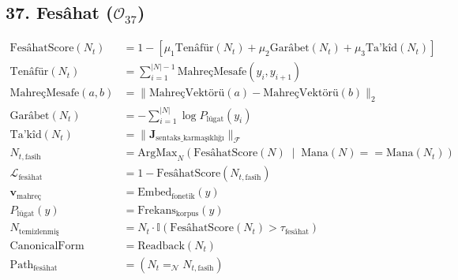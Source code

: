 \documentclass[11pt, a4paper]{article}
\begin{document}
\subsection{37. Fesâhat ($\mathcal{O}_{37}$)}
\begin{align}
\text{FesâhatScore}(N_t) &= 1 - \left[ \mu_1 \text{Tenâfür}(N_t) + \mu_2 \text{Garâbet}(N_t) + \mu_3 \text{Ta'kîd}(N_t) \right] \\
\text{Tenâfür}(N_t) &= \sum_{i=1}^{|N|-1} \text{MahreçMesafe}(y_i, y_{i+1}) \\
\text{MahreçMesafe}(a, b) &= \| \text{MahreçVektörü}(a) - \text{MahreçVektörü}(b) \|_2 \\
\text{Garâbet}(N_t) &= -\sum_{i=1}^{|N|} \log P_{\text{lügat}}(y_i) \\
\text{Ta'kîd}(N_t) &= \| \mathbf{J}_{\text{sentaks\_karmaşıklığı}} \|_{\mathcal{F}} \\
N_{t, \text{fasîh}} &= \text{ArgMax}_{N} \left( \text{FesâhatScore}(N) \;\middle|\; \text{Mana}(N) == \text{Mana}(N_t) \right) \\
\mathcal{L}_{\text{fesâhat}} &= 1 - \text{FesâhatScore}(N_{t, \text{fasîh}}) \\
\mathbf{v}_{\text{mahreç}} &= \text{Embed}_{\text{fonetik}}(y) \\
P_{\text{lügat}}(y) &= \text{Frekans}_{\text{korpus}}(y) \\
N_{\text{temizlenmiş}} &= N_t \cdot \mathbb{I}(\text{FesâhatScore}(N_t) > \tau_{\text{fesâhat}}) \\
\text{CanonicalForm} &= \text{Readback}(N_t) \\
\text{Path}_{\text{fesâhat}} &= (N_t =_{\mathcal{N}} N_{t, \text{fasîh}})
\end{align}
\end{document}
